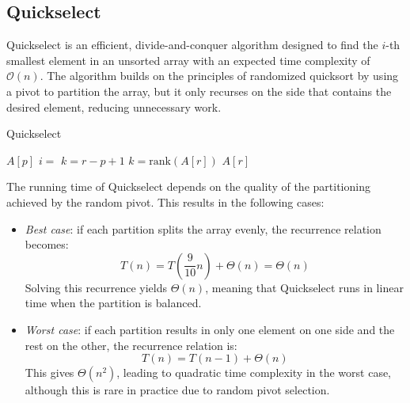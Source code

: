 \subsection{Quickselect}
Quickselect is an efficient, divide-and-conquer algorithm designed to find the $i$-th smallest element in an unsorted array with an expected time complexity of $\mathcal{O}(n)$. 
The algorithm builds on the principles of randomized quicksort by using a pivot to partition the array, but it only recurses on the side that contains the desired element, reducing unnecessary work.
\begin{algorithm}[H]
    \caption{Quickselect}
    \begin{algorithmic}[1]
                    \State \Return $A[p]$ 
                \EndIf 
                \State $i= $ 
                \State $k=r-p+1$ \Comment $k=\text{rank}(A[r])$ 
                    \State \Return $A[r]$   
                \EndIf 
                    \State \Return {}
                \Else 
                    \State \Return {}
                \EndIf 
            \EndFunction
    \end{algorithmic}
\end{algorithm}  
The running time of Quickselect depends on the quality of the partitioning achieved by the random pivot. 
This results in the following cases:
\begin{itemize}
    \item \textit{Best case}: if each partition splits the array evenly, the recurrence relation becomes: 
        \[T(n) = T\left(\dfrac{9}{10}n\right) + \Theta(n)= \Theta(n)\]
        Solving this recurrence yields $\Theta(n)$, meaning that Quickselect runs in linear time when the partition is balanced.
    \item \textit{Worst case}: if each partition results in only one element on one side and the rest on the other, the recurrence relation is:
        \[T(n)=T(n-1)+\Theta(n)\]
        This gives $\Theta(n^2)$, leading to quadratic time complexity in the worst case, although this is rare in practice due to random pivot selection.
\end{itemize}

